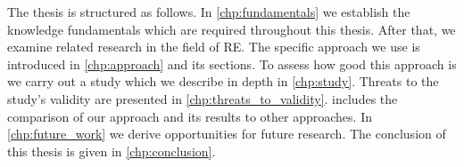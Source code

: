 The thesis is structured as follows.
In \cref{chp:fundamentals} we establish the knowledge fundamentals which are required throughout this thesis.
After that, we examine related research in the field of \ac{RE}.
The specific approach we use is introduced in \cref{chp:approach} and its sections.
To assess how good this approach is we carry out a study which we describe in depth in \cref{chp:study}.
Threats to the study's validity are presented in \cref{chp:threats_to_validity}.
 includes the comparison of our approach and its results to other approaches.
In \cref{chp:future_work} we derive opportunities for future research.
The conclusion of this thesis is given in \cref{chp:conclusion}.
